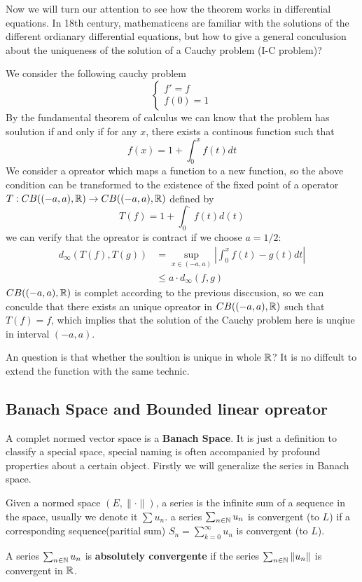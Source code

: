 \documentclass[en,hazy,black,noraml,12pt]{elegantnote}
\begin{document}
Now we will turn our attention to see how the theorem works in differential equations. In 18th century, mathematicens are familiar with the solutions of the different ordianary differential equations, but how to give a general conculusion about the uniqueness of the solution of a Cauchy problem (I-C problem)?

\begin{example}
    We consider the following cauchy problem 
    \[\begin{cases}
        f'=f \\
        f(0)=1
    \end{cases}\]
    By the fundamental theorem of calculus we can know that the problem has soulution if and only if for any \(x\), there exists a continous function such that 
    \[f(x) = 1+ \int^x_0 f(t)dt\]
    We consider a opreator which maps a function to a new function, so the above condition can be transformed to the existence of the fixed point of a operator \(T: CB((-a,a),\mathbb{R}) \to CB((-a,a),\mathbb{R})\) defined by 
    \[T(f) = 1+\int_0^{.}f(t)d(t)\]
    we can verify that the opreator is contract if we choose \(a =1/2\):
    \begin{align*}
        d_{\infty}(T(f),T(g)) &= \sup_{x \in (-a,a)}|\int_{0}^{x}f(t)-g(t)dt| \\
        &\leq a \cdot d_{\infty}(f,g)
    \end{align*}
    \(CB((-a,a),\mathbb{R})\) is complet according to the previous disccusion, so we can conculde that there exists an unique opreator in \(CB((-a,a),\mathbb{R})\) such that \(T(f)=f\), which implies that the solution of the Cauchy problem here is unqiue in interval \((-a,a)\). 

    An question is that whether the soultion is unique in whole \(\mathbb{R}\)? It is no diffcult to extend the function with the same technic. 
\end{example}

\subsection{Banach Space and Bounded linear opreator}

A complet normed vector space is a \textbf{Banach Space}. It is just a  definition to classify a special space, special naming is often accompanied by profound properties about a certain object. Firstly we will generalize the series in Banach space.

\begin{definition}[Series] 
    Given a normed space \((E,\|\cdot\|)\), a series is the infinite sum of a sequence in the space, usually we denote it \(\sum u_n\). a series \(\sum_{n \in \mathbb{N}}u_n\) is convergent (to \(L\)) if a corresponding sequence(paritial sum) \(S_n= \sum_{k=0}^{\infty}u_n\) is convergent (to \(L\)).

    A series \(\sum_{n \in \mathbb{N}}u_n\) is \textbf{absolutely convergente} if the series \(\sum_{n \in \mathbb{N}}\|u_n\|\) is convergent in \(\mathbb{R}\).
    
\end{definition}
\end{document}
